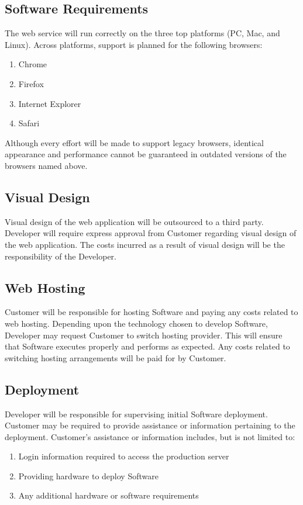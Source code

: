 \documentclass[11pt]{article}
\begin{document}
\subsection{Software Requirements}
The web service will run correctly on the three top platforms (PC, Mac, and Linux). Across platforms, support is planned for the following browsers:
\begin{enumerate}
\item Chrome
\item Firefox
\item Internet Explorer
\item Safari
\end{enumerate}
Although every effort will be made to support legacy browsers, identical appearance and performance cannot be guaranteed in outdated versions of the browsers named above.
\subsection{Visual Design}
Visual design of the web application will be outsourced to a third party. Developer will require express approval from Customer regarding visual design of the web application. The costs incurred as a result of visual design will be the responsibility of the Developer.
\subsection{Web Hosting}
Customer will be responsible for hosting Software and paying any costs related to web hosting. Depending upon the technology chosen to develop Software, Developer may request Customer to switch hosting provider. This will ensure that Software executes properly and performs as expected. Any costs related to switching hosting arrangements will be paid for by Customer.
\subsection{Deployment}
Developer will be responsible for supervising initial Software deployment. Customer may be required to provide assistance or information pertaining to the deployment. Customer's assistance or information includes, but is not limited to:
\begin{enumerate}
\item Login information required to access the production server
\item Providing hardware to deploy Software
\item Any additional hardware or software requirements 
\end{enumerate}
\end{document}
